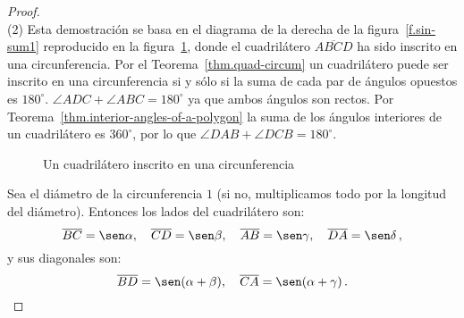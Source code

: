 \begin{proof}
\mbox{}\\
(2)
Esta demostración se basa en el diagrama de la derecha de la figura~\ref{f.sin-sum1} reproducido en la figura~\ref{f.trig-quad-circle}, donde el cuadrilátero $\overline{ABCD}$ ha sido inscrito en una circunferencia.
Por el Teorema~\ref{thm.quad-circum} un cuadrilátero puede ser inscrito en una circunferencia si y sólo si la suma de cada par de ángulos opuestos es $180^\circ$.
$\angle ADC+\angle ABC=180^\circ$ ya que ambos ángulos son rectos. Por Teorema~\ref{thm.interior-angles-of-a-polygon} la suma de los ángulos interiores de un cuadrilátero es $360^\circ$, por lo que $\angle DAB+\angle DCB=180^\circ$. 
\begin{figure}[t]
\begin{center}
\end{center}
\caption{Un cuadrilátero inscrito en una circunferencia}\label{f.trig-quad-circle}
\end{figure}

Sea el diámetro de la circunferencia $1$ (si no, multiplicamos todo por la longitud del diámetro). Entonces los lados del cuadrilátero son:
\[
\overline{BC}=\sen\alpha,\quad \overline{CD}=\sen\beta,\quad \overline{AB}=\sen\gamma,\quad \overline{DA}=\sen\delta\,,
\]
y sus diagonales son:
\[
\overline{BD}=\sen(\alpha + \beta),\quad \overline{CA}=\sen (\alpha+\gamma)\,.
\]


\end{proof}
